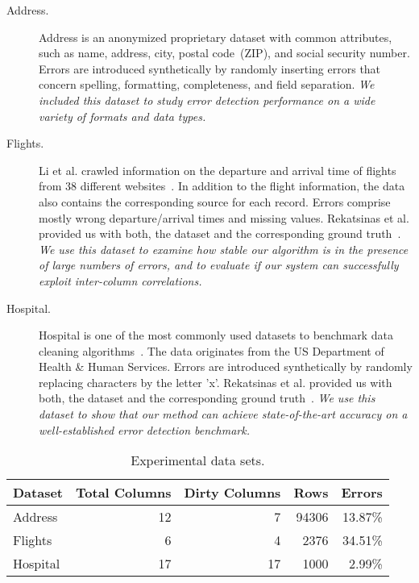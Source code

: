 \begin{description}
  \item[Address.] Address is an anonymized proprietary dataset with common attributes, such as name, address, city, postal code~(ZIP), and social security number. Errors are introduced synthetically by randomly inserting errors that concern spelling, formatting, completeness, and field separation. \textit{We included this dataset to study error detection performance on a wide variety of formats and data types.}
  \item[Flights.] Li et al. crawled information on the departure and arrival time of flights from 38 different websites~\cite{li2012truth}. In addition to the flight information, the data also contains the corresponding source for each record. Errors comprise mostly wrong departure/arrival times and missing values.
  Rekatsinas et al. provided us with both, the dataset and the corresponding ground truth~\cite{rekatsinas2017holoclean}. \textit{We use this dataset to examine how stable our algorithm is in the presence of large numbers of errors, and to evaluate if our system can successfully exploit inter-column correlations.}
  \item[Hospital.] Hospital is one of the most commonly used datasets to benchmark data cleaning algorithms~\cite{rekatsinas2017holoclean, chu2013holistic, dallachiesa2013nadeef}. The data originates from the US Department of Health \& Human Services. Errors are introduced synthetically by randomly replacing characters by the letter 'x'. Rekatsinas et al. provided us with both, the dataset and the corresponding ground truth~\cite{rekatsinas2017holoclean}. \textit{We use this dataset to show that our method can achieve state-of-the-art accuracy on a well-established error detection benchmark.}
\end{description}

\begin{table}[t]
\centering
\caption{Experimental data sets.}
\label{tab:datasets}
\begin{tabular}{|l|r|r|r|r|} \hline
Dataset& Total Columns& Dirty Columns& Rows& Errors\\ \hline
Address& 12& 7 & 94306& 13.87\%\\ \hline
Flights& 6& 4 & 2376& 34.51\%\\ \hline
Hospital& 17& 17 & 1000& 2.99\%\\ \hline
\end{tabular}
\end{table}



